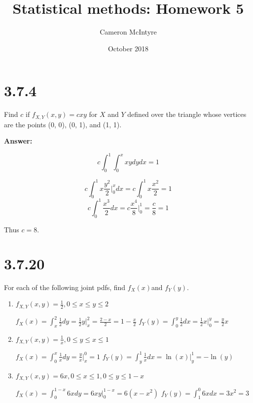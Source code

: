 \documentclass[svgnames]{article}
\title{Statistical methods: Homework 5}
\author{Cameron McIntyre}
\date{October 2018}
\begin{document}
\maketitle


\section{3.7.4}
 Find $c$ if $f_{X,Y}(x, y) = cxy$ for $X$ and $Y$ defined over the triangle whose vertices are the points (0, 0), (0, 1), and (1, 1).
 
\textbf{Answer:}

$$c\int_{0}^{1}\int_{0}^{x}xydydx=1$$

$$c\int_{0}^{1}x\frac{y^2}{2} \Big|_{0}^{x} dx=c\int_{0}^{1}x\frac{x^2}{2} =1$$
$$c\int_{0}^{1}\frac{x^3}{2}dx=c\frac{x^4}{8}\Big|_{0}^{1} =\frac{c}{8}=1$$

Thus $c=8$.
 
\section{3.7.20}
For each of the following joint pdfs, find $f_X(x)$and $f_Y(y)$. 
\begin{enumerate}[label=(\alph*)]
\item $f_{X,Y}(x,y) = \frac{1}{2}, 0 \leq x \leq y \leq 2$

 $f_{X}(x) =\int_{x}^{2} \frac{1}{2}dy=\frac{1}{2}y \Big|_{x}^{2}=\frac{2-x}{2}=1-\frac{x}{2}$
 \newline
 $f_{Y}(y) = \int_{0}^{y}\frac{1}{2}dx=\frac{1}{2}x \Big|_{0}^{y}= \frac{y}{2}x$
 
\item $f_{X,Y}(x,y) = \frac{1}{x}, 0 \leq y \leq x \leq 1$

$f_{X}(x) = \int_{0}^{x}\frac{1}{x}dy = \frac{y}{x}\Big|_{x}^{0}=1$
 \newline
$f_{Y}(y) = \int_{y}^{1}\frac{1}{x}dx = \ln(x)\Big|_{y}^{1}=-\ln(y)$

\item $f_{X,Y}(x,y) = 6x, 0 \leq x \leq 1, 0 \leq y  \leq 1 - x$

$f_{X}(x) = \int_{0}^{1-x} 6x dy= 6xy\Big|^{1-x}_{0}=6(x-x^2)$
 \newline
$f_{Y}(y) = \int_{1}^{0} 6x dx = 3x^2 = 3$

\end {enumerate}
\end{document}
